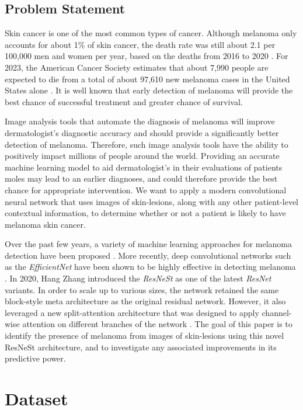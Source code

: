 \documentclass [MAS] {uclathes}
\begin{document}
\section{Problem Statement}

Skin cancer is one of the most common types of cancer. Although melanoma only accounts for about 1\% of skin cancer, the death rate was still about 2.1 per 100,000 men and women per year, based on the deaths from 2016 to 2020 \cite{SEER}. For 2023, the American Cancer Society estimates that about 7,990 people are expected to die from a total of about 97,610 new melanoma cases in the United States alone \cite{ACS}. It is well known that early detection of melanoma will provide the best chance of successful treatment and greater chance of survival. 

Image analysis tools that automate the diagnosis of melanoma will improve dermatologist's diagnostic accuracy and should provide a significantly better detection of melanoma. Therefore, such image analysis tools have the ability to positively impact millions of people around the world. Providing an accurate machine learning model to aid dermatologist's in their evaluations of patients moles may lead to an earlier diagnoses, and could therefore provide the best chance for appropriate intervention. We want to apply a modern convolutional neural network that uses images of skin-lesions, along with any other patient-level contextual information, to determine whether or not a patient is likely to have melanoma skin cancer.

Over the past few years, a variety of machine learning approaches for melanoma detection have been proposed \cite{VariousMethods}. More recently, deep convolutional networks such as the \textit{EfficientNet} have been shown to be highly effective in detecting melanoma \cite{EffNet_MelDet}. In 2020, Hang Zhang introduced the \textit{ResNeSt} as one of the latest \textit{ResNet} variants. In order to scale up to various sizes, the network retained the same block-style meta architecture as the original residual network. However, it also leveraged a new split-attention architecture that was designed to apply channel-wise attention on different branches of the network \cite{resnest}. The goal of this paper is to identify the presence of melanoma from images of skin-lesions using this novel ResNeSt architecture, and to investigate any associated improvements in its predictive power. 

\chapter{Dataset}
\end{document}
